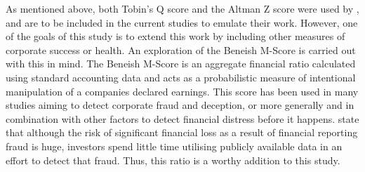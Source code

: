 {As mentioned above, both Tobin's Q score and the Altman Z score were used by \cite{moldovan2015learning}, and are to be included in the current studies to emulate their work. However, one of the goals of this study is to extend this work by including other measures of corporate success or health. An exploration of the Beneish M-Score is carried out with this in mind. The Beneish M-Score is an aggregate financial ratio calculated using standard accounting data and acts as a probabilistic measure of intentional manipulation of a companies declared earnings. This score has been used in many studies aiming to detect corporate fraud and deception, or more generally and in combination with other factors to detect financial distress before it happens. \cite{beneishCost} state that although the risk of significant financial loss as a result of financial reporting fraud is huge, investors spend little time utilising publicly available data in an effort to detect that fraud. Thus, this ratio is a worthy addition to this study. }\\\\
